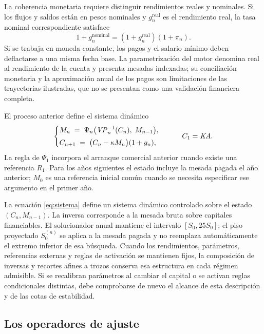 La coherencia monetaria requiere distinguir rendimientos reales y nominales.
Si los flujos y saldos están en pesos nominales y $g_n^{\mathrm{real}}$ es
el rendimiento real, la tasa nominal correspondiente satisface
\[
  1+g_n^{\mathrm{nominal}}
  =(1+g_n^{\mathrm{real}})(1+\pi_n).
\]
Si se trabaja en moneda constante, los pagos y el salario mínimo deben
deflactarse a una misma fecha base. La parametrización del motor denomina
real al rendimiento de la cuenta y presenta mesadas indexadas; su
conciliación monetaria y la aproximación anual de los pagos son limitaciones
de las trayectorias ilustradas, que no se presentan como una validación
financiera completa.

\begin{definition}
\label{def:sistema-rp}
El proceso anterior define el sistema dinámico
\begin{equation}
\label{eq:sistema}
  \begin{cases}
    M_n \;=\; \Psi_n\bigl(\mathit{VP}_n^{-1}(C_n),\;M_{n-1}\bigr),\\[3pt]
    C_{n+1} \;=\; \bigl(C_n-\kappa M_n\bigr)(1+g_n),
  \end{cases}
  \qquad C_1=\mathit{KA} .
\end{equation}
La regla de $\Psi_1$ incorpora el arranque comercial anterior cuando existe
una referencia $R_1$. Para los años siguientes el estado incluye la mesada
pagada el año anterior; $M_0$ es una referencia inicial común cuando se
necesita especificar ese argumento en el primer año.
\end{definition}

\begin{remark}
La ecuación \cref{eq:sistema} define un sistema dinámico controlado sobre el estado
$(C_n,M_{n-1})$. La inversa corresponde a la mesada bruta sobre capitales
financiables. El solucionador anual mantiene el intervalo $[S_0,25S_0]$;
el piso proyectado $S_0^{(n)}$ se aplica a la mesada pagada y no reemplaza
automáticamente el extremo inferior de esa búsqueda. Cuando los rendimientos,
parámetros, referencias externas y reglas de activación se mantienen fijos,
la composición de inversas y recortes afines a trozos conserva esa estructura
en cada régimen admisible. Si se recalibran parámetros al cambiar el capital
o se activan reglas condicionales distintas, debe comprobarse de nuevo el
alcance de esta descripción y de las cotas de estabilidad.
\end{remark}

\subsection{Los operadores de ajuste}
\label{sec:operadores}

